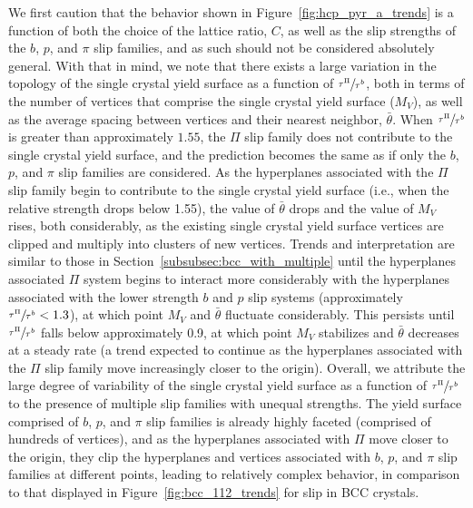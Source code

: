 \documentclass[preprint,3p,times,sort&compress,letterpaper,12pt]{elsarticle} %
\begin{document}
We first caution that the behavior shown in Figure~\ref{fig:hcp_pyr_a_trends} is a function of both the choice of the lattice ratio, $C$, as well as the slip strengths of the $b$, $p$, and $\pi$ slip families, and as such should not be considered absolutely general. With that in mind, we note that there exists a large variation in the topology of the single crystal yield surface as a function of $\sfrac{\tau^{\Pi}}{\tau^{b}}$, both in terms of the number of vertices that comprise the single crystal yield surface ($M_V$), as well as the average spacing between vertices and their nearest neighbor, $\bar{\theta}$. When $\sfrac{\tau^{\Pi}}{\tau^{b}}$ is greater than approximately $1.55$, the $\Pi$ slip family does not contribute to the single crystal yield surface, and the prediction becomes the same as if only the $b$, $p$, and $\pi$ slip families are considered. As the hyperplanes associated with the $\Pi$ slip family begin to contribute to the single crystal yield surface (i.e., when the relative strength drops below 1.55), the value of $\bar{\theta}$ drops and the value of $M_V$ rises, both considerably, as the existing single crystal yield surface vertices are clipped and multiply into clusters of new vertices. Trends and interpretation are similar to those in Section~\ref{subsubsec:bcc_with_multiple} until the hyperplanes associated $\Pi$ system begins to interact more considerably with the hyperplanes associated with the lower strength $b$ and $p$ slip systems (approximately $\sfrac{\tau^{\Pi}}{\tau^{b}}<1.3$), at which point $M_V$ and $\bar{\theta}$ fluctuate considerably. This persists until $\sfrac{\tau^{\Pi}}{\tau^{b}}$ falls below approximately 0.9, at which point $M_V$ stabilizes and $\bar{\theta}$ decreases at a steady rate (a trend expected to continue as the hyperplanes associated with the $\Pi$ slip family move increasingly closer to the origin). Overall, we attribute the large degree of variability of the single crystal yield surface as a function of $\sfrac{\tau^{\Pi}}{\tau^{b}}$ to the presence of multiple slip families with unequal strengths. The yield surface comprised of $b$, $p$, and $\pi$ slip families is already highly faceted (comprised of hundreds of vertices), and as the hyperplanes associated with $\Pi$ move closer to the origin, they clip the hyperplanes and vertices associated with $b$, $p$, and $\pi$ slip families at different points, leading to relatively complex behavior, in comparison to that displayed in Figure~\ref{fig:bcc_112_trends} for  slip in BCC crystals.

\end{document}
